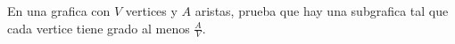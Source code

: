 \begin{problem}
    En una grafica con $V$ vertices y $A$ aristas, prueba que hay una subgrafica tal que cada vertice
    tiene grado al menos $\frac AV$.
    \label{24EN484}
\end{problem}